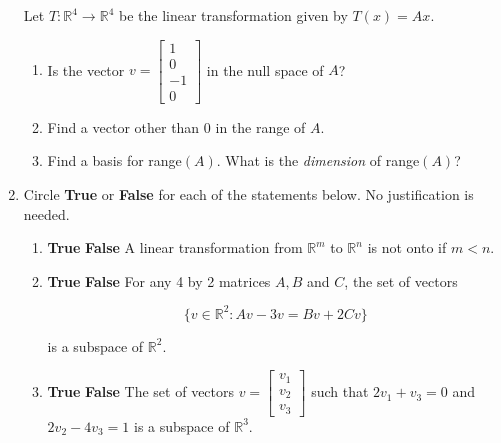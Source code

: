 \documentclass[12 pt]{report}
\begin{document}
\begin{enumerate}
Let $T: \mathbb{R}^4 \to \mathbb{R}^4$ be the linear transformation given by $T(x) = Ax$. 

\begin{enumerate}
\item Is the vector $v = \begin{bmatrix} 1 \\ 0 \\ -1 \\ 0 \end{bmatrix}$ in the null space of $A$? 

\vfill

\item Find a vector other than $0$ in the range of $A$.

\vfill

\item Find a basis for range$(A)$. What is the \emph{dimension} of range$(A)$?

\vfill

\end{enumerate}


\newpage

\item Circle \textbf{True} or \textbf{False} for each of the statements below. No justification is needed. 

\begin{enumerate} \item \textbf{True} \hspace{5pt} \textbf{False} \hspace{5pt} A linear transformation from $\mathbb{R}^m$ to $\mathbb{R}^n$ is not onto if $m < n$. 

\vfill 

\item \textbf{True} \hspace{5pt} \textbf{False} \hspace{5pt} For any 4 by 2 matrices $A, B$ and $C$, the set of vectors 

$$\{v \in \mathbb{R}^2: Av - 3v = Bv + 2Cv\}$$

is a subspace of $\mathbb{R}^2$. 

\vfill 

\item \textbf{True} \hspace{5pt} \textbf{False} \hspace{5pt} The set of vectors $v = \begin{bmatrix} v_1 \\ v_2 \\ v_3 \end{bmatrix}$ such that $2v_1 + v_3 = 0$ and $2v_2 - 4v_3 = 1$ is a subspace of $\mathbb{R}^3$. 


\end{enumerate}
\end{enumerate}
\end{document}
